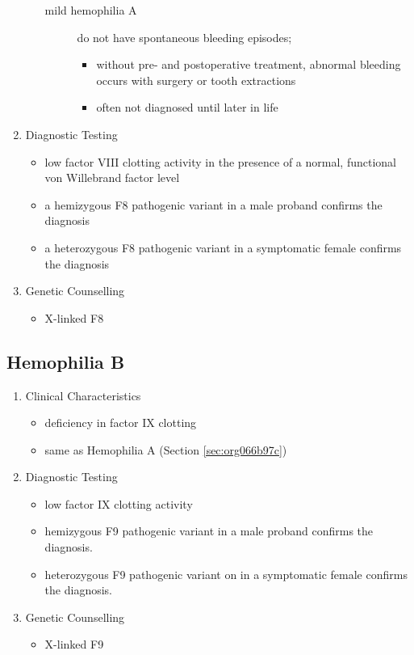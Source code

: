 \documentclass[12pt]{scrartcl}
\begin{document}
\begin{enumerate}
\begin{itemize}
\begin{description}
\item[{mild hemophilia A }] do not have spontaneous bleeding episodes;
\begin{itemize}
\item without pre- and postoperative treatment, abnormal bleeding occurs with surgery
or tooth extractions
\item often not diagnosed until later in life
\end{itemize}
\end{description}
\end{itemize}
\item Diagnostic Testing
\label{sec:org97da966}
\begin{itemize}
\item low factor VIII clotting activity in the presence of a normal,
functional von Willebrand factor level
\item a hemizygous F8 pathogenic variant in a male proband confirms the
diagnosis
\item a heterozygous F8 pathogenic variant in a symptomatic female
confirms the diagnosis
\end{itemize}
\item Genetic Counselling
\label{sec:org5de5471}
\begin{itemize}
\item X-linked F8
\end{itemize}
\end{enumerate}

\subsection{Hemophilia B}
\label{sec:org541efd1}
\begin{enumerate}
\item Clinical Characteristics
\label{sec:orgec4f38d}
\begin{itemize}
\item deficiency in factor IX clotting
\item same as Hemophilia A (Section \ref{sec:org066b97c})
\end{itemize}
\item Diagnostic Testing
\label{sec:orge868bde}
\begin{itemize}
\item low factor IX clotting activity
\item hemizygous F9 pathogenic variant in a male proband confirms the
diagnosis.
\item heterozygous F9 pathogenic variant on in a symptomatic female
confirms the diagnosis.
\end{itemize}
\item Genetic Counselling
\label{sec:orgab58d1a}
\begin{itemize}
\item X-linked F9
\end{itemize}
\end{enumerate}
\end{document}
